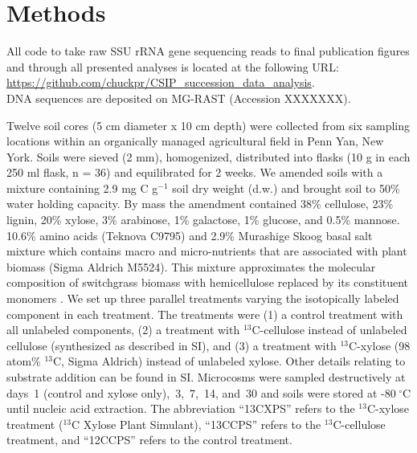 \section{Methods}
%
All code to take raw SSU rRNA gene sequencing reads to final publication
figures and through all presented analyses is located at the following URL:\\
\url{https://github.com/chuckpr/CSIP_succession_data_analysis}.\\ DNA sequences
are deposited on MG-RAST (Accession XXXXXXX).

Twelve soil cores (5 cm diameter x 10 cm depth) were collected from six 
sampling locations within an organically managed agricultural field in Penn
Yan, New York. Soils were sieved (2 mm), homogenized, distributed into flasks
(10 g in each 250 ml flask, n = 36) and equilibrated for 2 weeks. We amended
soils with a mixture containing 2.9 mg C g$^{-1}$ soil dry weight (d.w.) and
brought soil to 50\% water holding capacity. By mass the amendment
contained 38\% cellulose, 23\% lignin, 20\% xylose, 3\% arabinose, 1\%
galactose, 1\% glucose, and 0.5\% mannose. 10.6\% amino acids (Teknova C9795)
and 2.9\% Murashige Skoog basal salt mixture which contains macro and
micro-nutrients that are associated with plant biomass (Sigma Aldrich M5524).
This mixture approximates the molecular composition of switchgrass biomass with
hemicellulose replaced by its constituent monomers
\citep{Schneckenberger_2008}. We set up three parallel treatments varying the
isotopically labeled component in each treatment. The treatments were (1)
a control treatment with all unlabeled components, (2) a treatment with
$^{13}$C-cellulose instead of unlabeled cellulose (synthesized as described in
SI), and (3) a treatment with $^{13}$C-xylose (98 atom\% $^{13}$C, Sigma
Aldrich) instead of unlabeled xylose. Other details relating to substrate
addition can be found in SI. Microcosms were sampled destructively at days~1
(control and xylose only),~3,~7,~14, and~30 and soils were stored at
-80 $^{\circ}$C until nucleic acid extraction. The abbreviation “13CXPS” refers
to the $^{13}$C-xylose treatment ($^{13}$C Xylose Plant Simulant), “13CCPS”
refers to the $^{13}$C-cellulose treatment, and “12CCPS” refers to the control
treatment.

